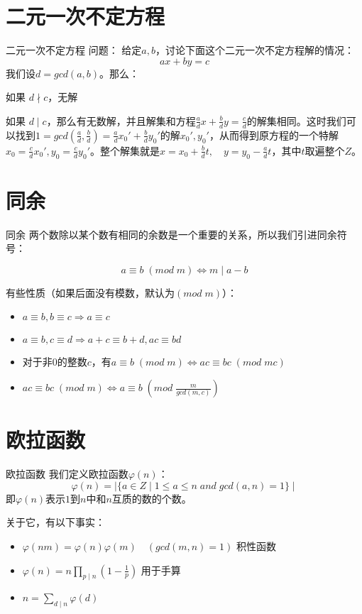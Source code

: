 \documentclass[9pt]{beamer}
\begin{document}
	\section{二元一次不定方程} 
		\begin{frame}{二元一次不定方程} 
			问题：
			\quad 给定$a,b$，讨论下面这个二元一次不定方程解的情况：
			$$
				ax + by = c
			$$
			我们设$d = gcd(a,b)$。那么：

			\quad 如果 $d \nmid c$，无解
			
			\quad 如果 $d \mid c$，那么有无数解，并且解集和方程$\frac{a}{d}x+\frac{b}{d}y = \frac{c}{d}$的解集相同。这时我们可以找到$1 = gcd(\frac{a}{d},\frac{b}{d}) = \frac{a}{d}x_0'+\frac{b}{d}y_0'$的解$x_0',y_0'$，从而得到原方程的一个特解$x_0 = \frac{c}{d}x_0', y_0 = \frac{c}{d}y_0'$。整个解集就是$x = x_0 + \frac{b}{d}t, \quad	y = y_0 - \frac{a}{d}t	$，其中$t$取遍整个$Z$。
			
		\end{frame}
	\section{同余}
		\begin{frame}{同余}		
		两个数除以某个数有相同的余数是一个重要的关系，所以我们引进同余符号：
		
		$$
			a \equiv b \; ( mod \; m ) \Leftrightarrow m \mid a - b
		$$
		
		有些性质（如果后面没有模数，默认为$(mod \; m)$）：
		\begin{itemize}
			\item $a \equiv b, b \equiv c \Rightarrow a \equiv c$
			\item $a \equiv b, c \equiv d \Rightarrow a + c \equiv b + d, ac \equiv bd$
			\item 对于非$0$的整数$c$，有$a \equiv b \; (mod \; m) \Leftrightarrow ac \equiv bc \; (mod \; mc) $
			\item $ac \equiv bc \; ( mod \; m ) \Leftrightarrow a \equiv b \; ( mod \;\frac{m}{gcd(m,c)}) $
		\end{itemize}
		
		\end{frame} 
	\section{欧拉函数} 
		\begin{frame}{欧拉函数} 
			我们定义欧拉函数$\varphi(n)$：
			$$
				\varphi(n) = \mid  \{ a \in Z \mid 1 \leq a \leq n \; and \; gcd(a,n) = 1 \} \mid 
			$$
			即$\varphi(n)$表示$1$到$n$中和$n$互质的数的个数。
			
			关于它，有以下事实：
			
			\begin{itemize}
				\item $\varphi(nm) = \varphi(n)\varphi(m)  \quad (gcd(m,n) = 1)$  积性函数
				\item $\varphi(n) = n\prod_{p \mid n} (1 - \frac{1}{p}) $ 用于手算
				\item $ n = \sum_{d \mid n}\varphi(d)$  
			\end{itemize}
			
		\end{frame}
		
\end{document}
